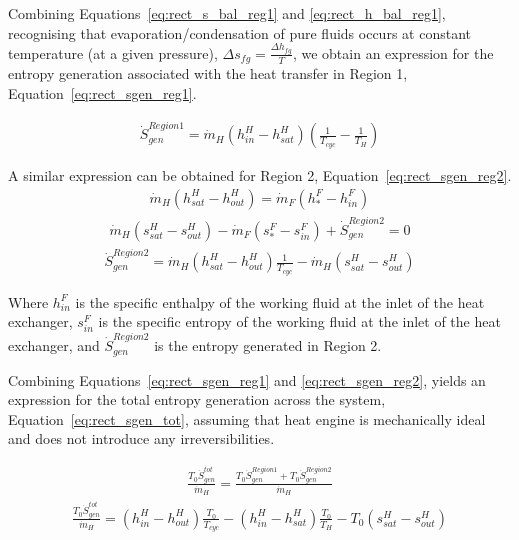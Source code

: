         Combining Equations~\ref{eq:rect_s_bal_reg1} and \ref{eq:rect_h_bal_reg1}, recognising that evaporation/condensation of pure fluids occurs at constant temperature (at a given pressure), \(\Delta s_{fg}=\frac{\Delta h_{fg}}{T}\), we obtain an expression for the entropy generation associated with the heat transfer in Region 1, Equation~\ref{eq:rect_sgen_reg1}.

        \begin{align}
            \Dot{S}_{gen}^{Region 1} = \Dot{m}_{H}(h_{in}^{H}-h_{sat}^{H}) \left(\frac{1}{T_{cyc}} - \frac{1}{T_{H}}\right) \label{eq:rect_sgen_reg1}
        \end{align}

        A similar expression can be obtained for Region 2, Equation~\ref{eq:rect_sgen_reg2}.
        \begin{align}
             \Dot{m}_{H}(h_{sat}^{H}-h_{out}^{H}) = \Dot{m}_{F}(h_{*}^{F}-h_{in}^{F}) \label{eq:rect_h_bal_reg2}
        \end{align}
        \begin{align}
            \Dot{m}_{H}(s_{sat}^{H}-s_{out}^{H}) - \Dot{m}_{F}(s_{*}^{F}-s_{in}^{F}) + \Dot{S}_{gen}^{Region 2} = 0 \label{eq:rect_s_bal_reg2}
        \end{align}
        \begin{align}
            \Dot{S}_{gen}^{Region 2} = \Dot{m}_{H}(h_{sat}^{H}-h_{out}^{H})\frac{1}{T_{cyc}} - \Dot{m}_{H}(s_{sat}^{H}-s_{out}^{H}) \label{eq:rect_sgen_reg2}
        \end{align}

        Where \(h_{in}^{F}\) is the specific enthalpy of the working fluid at the inlet of the heat exchanger, \(s_{in}^{F}\) is the specific entropy of the working fluid at the inlet of the heat exchanger, and \(\Dot{S}_{gen}^{Region 2}\) is the entropy generated in Region 2.

        Combining Equations~\ref{eq:rect_sgen_reg1} and \ref{eq:rect_sgen_reg2}, yields an expression for the total entropy generation across the system, Equation~\ref{eq:rect_sgen_tot}, assuming that heat engine is mechanically ideal and does not introduce any irreversibilities.

        \begin{align}
            \frac{T_0\Dot{S}_{gen}^{tot}}{\Dot{m}_{H}} =\frac{T_0\Dot{S}_{gen}^{Region 1} + T_0\Dot{S}_{gen}^{Region 2}}{\Dot{m}_{H}}
        \end{align}
        \begin{align}
            \frac{T_0\Dot{S}_{gen}^{tot}}{\Dot{m}_{H}} = (h_{in}^{H}-h_{out}^{H})\frac{T_0}{T_{cyc}} - (h_{in}^{H}-h_{sat}^{H})\frac{T_0}{T_{H}}  - T_0(s_{sat}^{H}-s_{out}^{H}) \label{eq:rect_sgen_tot}
        \end{align}

